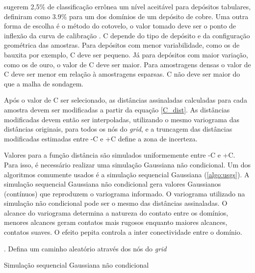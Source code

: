  sugerem 2,5\% de classificação errônea um nível aceitável para depósitos tabulares, \cite{martin2017implicitmodeling} definiram como 3.9\% para um dos domínios de um depósito de cobre. Uma outra forma de escolha é o método do cotovelo, o valor tomado deve ser o ponto de inflexão da curva de calibração \cite{martin2017implicitmodeling}. C depende do tipo de depósito e da configuração geométrica das amostras. Para depósitos com menor variabilidade, como os de bauxita por exemplo, C deve ser pequeno. Já para depósitos com maior variação, como os de ouro, o valor de C deve ser maior. Para amostragens densas o valor de C deve ser menor em relação à amostragens esparsas. C não deve ser maior do que a malha de sondagem.

Após o valor de C ser selecionado, as distâncias assinaladas calculadas para cada amostra devem ser modificadas a partir da equação \autoref{C_dist}. As distâncias modificadas devem então ser interpoladas, utilizando o mesmo variograma das distâncias originais, para todos os nós do \textit{grid}, e a truncagem das distâncias modificadas estimadas entre -C e +C define a zona de incerteza.

Valores para a função distância são simulados uniformemente entre -C e +C. Para isso, é necessário realizar uma simulação Gaussiana não condicional. Um dos algoritmos comumente usados é a simulação sequencial Gaussiana (\autoref{algo:usgs}). A simulação sequencial Gaussiana não condicional gera valores Gaussianos (contínuos) que reproduzem o variograma informado. O variograma utilizado na simulação não condicional pode ser o mesmo das distâncias assinaladas. O alcance do variograma determina a natureza do contato entre os domínios, menores alcances geram contatos mais rugosos enquanto maiores alcances, contatos suaves. O efeito pepita controla a inter conectividade entre o domínio.

\begin{algorithm}
. Defina um caminho aleatório através dos nós do \textit{grid}\;
 \caption{Simulação sequencial Gaussiana não condicional}\label{algo:usgs}
\end{algorithm}

